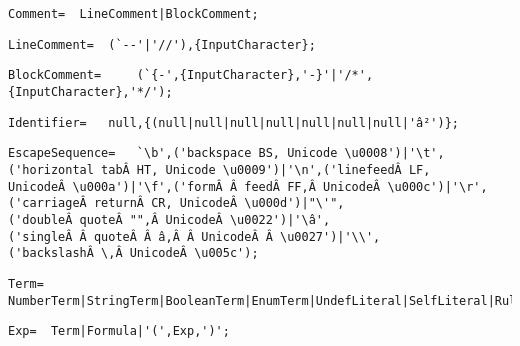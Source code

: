 \documentclass{article}
\begin{document}
    \begin{flushleft}
    \begin{lstlisting}[mathescape=true, breaklines=true]
      Comment= 	LineComment|BlockComment;
    \end{lstlisting}
    \end{flushleft}
    \begin{flushleft}
    \begin{lstlisting}[mathescape=true, breaklines=true]
      LineComment= 	(`--'|'//'),{InputCharacter};
    \end{lstlisting}
    \end{flushleft}
    \begin{flushleft}
    \begin{lstlisting}[mathescape=true, breaklines=true]
      BlockComment= 	(`{-',{InputCharacter},'-}'|'/*',{InputCharacter},'*/');
    \end{lstlisting}
    \end{flushleft}
    \begin{flushleft}
    \begin{lstlisting}[mathescape=true, breaklines=true]
      Identifier= 	null,{(null|null|null|null|null|null|null|'â²')};
    \end{lstlisting}
    \end{flushleft}
    \begin{flushleft}
    \begin{lstlisting}[mathescape=true, breaklines=true]
      EscapeSequence= 	`\b',('backspace BS, Unicode \u0008')|'\t',('horizontal tabÂ HT, Unicode \u0009')|'\n',('linefeedÂ LF, UnicodeÂ \u000a')|'\f',('formÂ Â feedÂ FF,Â UnicodeÂ \u000c')|'\r',('carriageÂ returnÂ CR, UnicodeÂ \u000d')|"\'",('doubleÂ quoteÂ "",Â UnicodeÂ \u0022')|'\â',('singleÂ Â quoteÂ Â â,Â Â UnicodeÂ Â \u0027')|'\\',('backslashÂ \,Â UnicodeÂ \u005c');
    \end{lstlisting}
    \end{flushleft}
    \begin{flushleft}
    \begin{lstlisting}[mathescape=true, breaklines=true]
      Term= 	NumberTerm|StringTerm|BooleanTerm|EnumTerm|UndefLiteral|SelfLiteral|RuleAsTerm|ValueTerm|StructureTerm;
    \end{lstlisting}
    \end{flushleft}
    \begin{flushleft}
    \begin{lstlisting}[mathescape=true, breaklines=true]
      Exp= 	Term|Formula|'(',Exp,')';
    \end{lstlisting}
    \end{flushleft}
\end{document}
